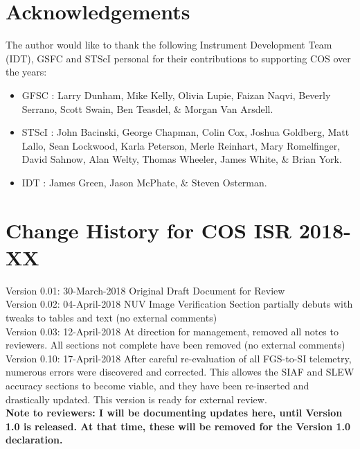 \documentclass{stsci_report}
\newcommand{\tacq}[1]{\texttt{ACQ/#1}}
\begin{document}
\clearpage



\clearpage

\section{Acknowledgements}
The author would like to thank the following Instrument Development Team (IDT), GSFC and STScI personal for their contributions to supporting COS over the years:
\begin{itemize}
\item{GFSC : }{Larry Dunham, Mike Kelly, Olivia Lupie,  Faizan Naqvi, Beverly Serrano, Scott Swain, Ben Teasdel, \& Morgan Van Arsdell.}
\item{STScI : }{John Bacinski, George Chapman, Colin Cox, Joshua Goldberg, Matt Lallo, Sean Lockwood, Karla Peterson, Merle Reinhart, Mary Romelfinger, David Sahnow, Alan Welty, Thomas Wheeler, James White, \& Brian York.}
\item{IDT : }{James Green, Jason McPhate, \& Steven Osterman.}
\end{itemize}
\section{Change History for COS ISR 2018-XX}\label{sec:History}
Version 0.01: 30-March-2018 Original Draft Document for Review \\
Version 0.02: 04-April-2018 NUV Image Verification Section partially debuts with tweaks to tables and text (no external comments) \\
Version 0.03: 12-April-2018 At direction for management, removed all notes to reviewers. All sections not complete have been removed (no external comments)\\
Version 0.10: 17-April-2018 After careful re-evaluation of all FGS-to-SI telemetry, numerous errors were discovered and corrected. This allowes the SIAF and SLEW accuracy sections to become viable, and they have been re-inserted and drastically updated. This version is ready for external review.\\
{\bf Note to reviewers: I will be documenting updates here, until Version 1.0 is released. At that time, these will be removed for the Version 1.0 declaration.}
\clearpage
\end{document}
